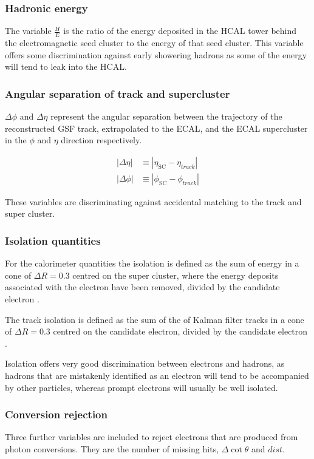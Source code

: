 \subsubsection{Hadronic energy}
The variable $\frac{H}{E}$ is the ratio of the energy deposited in the HCAL
tower behind the electromagnetic seed cluster to the energy of that seed
cluster. This variable offers some discrimination against early showering
hadrons as some of the energy will tend to leak into the HCAL.

\subsubsection{Angular separation of track and supercluster}
$\Delta\phi$ and $\Delta\eta$ represent the angular separation between the
trajectory of the reconstructed \ac{GSF} track, extrapolated to the ECAL, and
the ECAL supercluster in the $\phi$ and $\eta$ direction respectively.

\begin{align}
|\Delta\eta| &\equiv |\eta_{\text{SC}} - \eta_{track}|\\
|\Delta\phi| &\equiv |\phi_{\text{SC}} - \phi_{track}|
\end{align}

These variables are discriminating against accidental matching to the track and
super cluster.

\subsubsection{Isolation quantities}
For the calorimeter quantities the isolation is defined as the sum of energy in
a cone of $\Delta R = 0.3 $ centred on the super
cluster, where the energy deposits associated with the electron have been
removed, divided by the candidate electron \Pt.

The track isolation is defined as the sum of the \Pt of Kalman filter tracks in
a cone of $\Delta R = 0.3 $ centred on the candidate electron, divided by the
candidate electron \Pt.

Isolation offers very good discrimination between electrons and hadrons, as
hadrons that are mistakenly identified as an electron will tend to be
accompanied by other particles, whereas prompt electrons will usually be well
isolated.

\subsubsection{Conversion rejection}
Three further variables are included to reject electrons that are produced from
photon conversions. They are the number of missing hits, $\Delta\cot\theta$ and
$dist$. 

